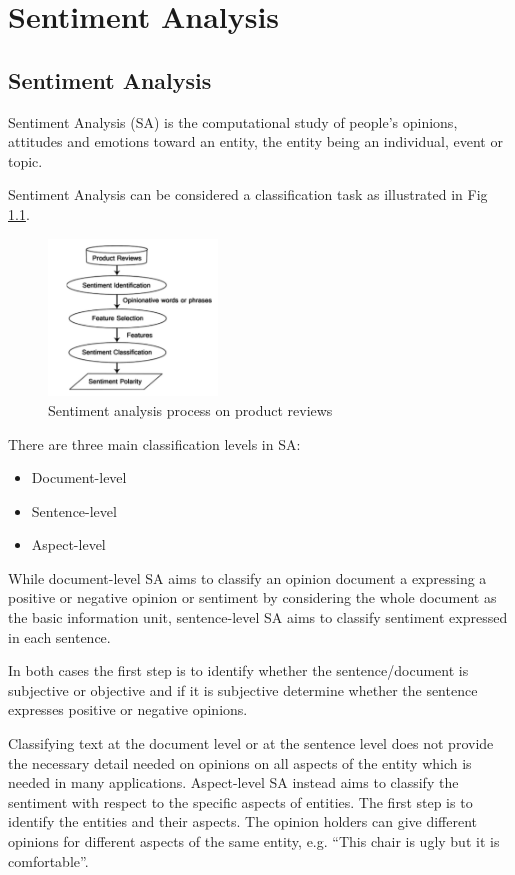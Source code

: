 \chapter{Sentiment Analysis}
\section{Sentiment Analysis} 
Sentiment Analysis (SA) is the computational study of people's opinions, attitudes and emotions toward an entity, the entity being an individual, event or topic.\cite{survey} \par

Sentiment Analysis can be considered a classification task as illustrated in Fig \ref{fig:sa_process}.\\

\begin{figure}[H]
\centering
\includegraphics[width=0.4\textwidth]{./chapters/chapter1/images/sa_process}
\caption{Sentiment analysis process on product reviews}
\label{fig:sa_process}
\end{figure}

There are three main classification levels in SA: 
\begin{itemize}
\item Document-level
\item Sentence-level
\item Aspect-level
\end{itemize}
While document-level SA aims to classify an opinion document a expressing a positive or negative opinion or sentiment by considering the whole document as the basic information unit, sentence-level SA aims to classify sentiment expressed in each sentence. \par
In both cases the first step is to identify whether the sentence/document is subjective or objective and if it is subjective  determine whether the sentence expresses positive or negative opinions. \par

Classifying text at the document level or at the sentence level does not provide the necessary detail needed on opinions on all aspects of the entity which is needed in many applications. Aspect-level SA instead aims to classify the sentiment with respect to the specific aspects of entities. The first step is to identify the entities and their aspects. The opinion holders can give different opinions for different aspects of the same entity, e.g. ``This chair is ugly but it is comfortable''.\par

